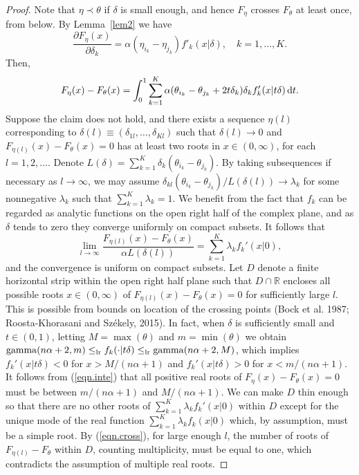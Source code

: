 \documentclass[11pt]{article}
\begin{document}
\begin{proof}
Note that $\eta\prec\theta$ if $\delta$ is small enough, and hence $F_\eta$ crosses $F_\theta$ at least once, from below.  By Lemma~\ref{lem2} we have 
$$\frac{\partial{F_{\eta}(x)}}{\partial \delta_k}  = \alpha (\eta_{i_k} - \eta_{j_k})  f'_k(x| \delta),\quad k=1,\ldots, K.$$
Then, 
\begin{equation}
\label{eqn.inte}
F_{\eta}(x) - F_\theta(x) = \int_0^1 \sum_{k=1}^K \alpha (\theta_{i_k} - \theta_{j_k}+ 2t\delta_k) \delta_k  f'_k(x|t\delta)\, {\rm d} t.
\end{equation}
Suppose the claim does not hold, and there exists a sequence $\eta(l)$ corresponding to $\delta(l)\equiv (\delta_{1l}, \ldots, \delta_{Kl})$ such that $\delta(l) \to 0$ and $F_{\eta(l)}(x)-F_\theta(x)=0$ has at least two roots in $x\in (0,\infty)$, for each $l=1,2,\ldots$.  Denote $L(\delta) = \sum_{k=1}^K \delta_k (\theta_{i_k} - \theta_{j_k})$. 
 By taking subsequences if necessary as $l\to\infty$, we may assume $\delta_{kl}(\theta_{i_k} -\theta_{j_k})/L(\delta(l)) \to \lambda_k$ for some nonnegative $\lambda_k$ such that $\sum_{k=1}^K \lambda_k = 1$.  We benefit from the fact that $f_k$ can be regarded as analytic functions on the open right half of the complex plane, and as $\delta$ tends to zero they converge uniformly on compact subsets.  It follows that 
\begin{equation}
\label{eqn.cross}
\lim_{l\to\infty} \frac{F_{\eta(l)}(x) - F_\theta(x)}{ \alpha L(\delta(l))} = \sum_{k=1}^K \lambda_k f_k'(x|0),
\end{equation}
and the convergence is uniform on compact subsets.  Let $D$ denote a finite horizontal strip within the open right half plane such that $D\cap \mathbb{R}$ encloses all possible roots $x\in (0, \infty)$ of $F_{\eta(l)}(x) - F_\theta(x)=0$ for sufficiently large $l$.  This is possible from bounds on location of the crossing points (Bock et al. 1987; Roosta-Khorasani and Sz\'{e}kely, 2015).  In fact, when $\delta$ is sufficiently small and $t\in (0,1)$, letting $M=\max(\theta)$ and $m=\min(\theta)$ we obtain ${\rm gamma}(n\alpha+2, m)\leq_{\rm lr} f_k(\cdot|t\delta)\leq_{\rm lr} {\rm gamma}(n\alpha +2, M)$, which implies $f_k'(x|t\delta) <0$ for $x> M/(n\alpha +1)$ and $f_k'(x|t\delta)>0$ for $x<m/(n\alpha+1)$.  It follows from (\ref{eqn.inte}) 
 that all positive real roots of $F_{\eta}(x) - F_\theta(x)=0$ must be between $m/(n\alpha+1)$ and $M/(n\alpha+1)$.  We can make $D$ thin enough so that there are no other roots of $\sum_{k=1}^K \lambda_k f_k'(x|0)$ within $D$ except for the unique mode of the real function $\sum_{k=1}^K \lambda_k f_k(x|0)$ which, by assumption, must be a simple root.  By (\ref{eqn.cross}), for large enough $l$, the number of roots of $F_{\eta(l)} - F_\theta$ within $D$, counting multiplicity, must be equal to one, which contradicts the assumption of multiple real roots.
\end{proof}
\end{document}
